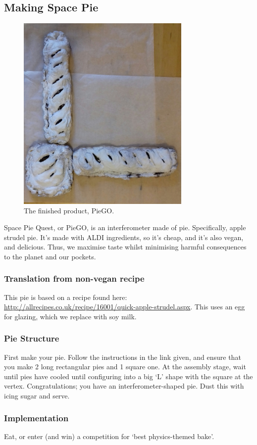 \documentclass{article}
\begin{document}
\begin{appendix}
\subsection{Making Space Pie}
\begin{figure}[h]
    \centering
    \includegraphics[width=0.75\textwidth]{PieGO.jpg}
    \caption{The finished product, PieGO.}
    \label{fig:PieGO}
\end{figure}
Space Pie Quest, or PieGO, is an interferometer made of
pie. Specifically, apple strudel pie. It's made with ALDI ingredients,
so it's cheap, and it's also vegan, and delicious. Thus, we maximise
taste whilst minimising harmful consequences to the planet and our
pockets.  

\subsubsection*{Translation from non-vegan recipe}
This pie is based on a recipe found here:\\
\url{http://allrecipes.co.uk/recipe/16001/quick-apple-strudel.aspx}. This
uses an egg for glazing, which we replace with soy milk. 

\subsubsection*{Pie Structure}
First make your pie. Follow the instructions in the link given, and
ensure that you make 2 long rectangular pies and 1 square one. At the
assembly stage, wait until pies have cooled until configuring into a
big `L' shape with the square at the vertex. Congratulations; you have
an interferometer-shaped pie. Dust this with icing sugar and serve.

\subsubsection*{Implementation}
Eat, or enter (and win) a competition for `best physics-themed bake'.

\end{appendix}

\clearpage



\end{document}
